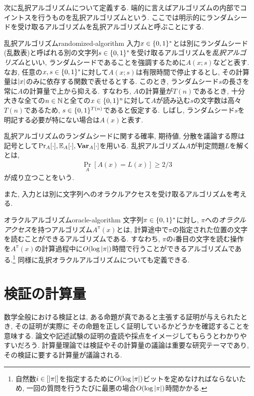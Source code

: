 次に乱択アルゴリズムについて定義する. 端的に言えばアルゴリズムの内部でコイントスを行うものを乱択アルゴリズムという.
ここでは明示的にランダムシードを受け取るアルゴリズムを乱択アルゴリズムと呼ぶことにする.

\begin{definition}{乱択アルゴリズム}{randomized-algorithm}
  入力$x\in\{0,1\}^*$とは別にランダムシード(乱数表)と呼ばれる別の文字列$s\in\{0,1\}^*$を受け取るアルゴリズムを\emph{乱択アルゴリズム}といい, ランダムシードであることを強調するために$A(x;s)$などと表す.
  なお, 任意の$x,s\in\{0,1\}^*$に対して$A(x;s)$は有限時間で停止するとし, その計算量は$\abs{x}$のみに依存する関数で表せるとする.
  このとき, ランダムシード$s$の長さを常に$A$の計算量で上から抑える.
  すなわち, $A$の計算量が$T(n)$であるとき, 十分大きな全ての$n\in\mathbb{N}$と全ての$x\in\{0,1\}^n$に対して$A$が読み込む$s$の文字数は高々$T(n)$であるため, $s\in \{0,1\}^{T(n)}$であると仮定する.
  しばし, ランダムシード$s$を明記する必要が特にない場合は$A(x)$と表す.

  乱択アルゴリズムのランダムシードに関する確率, 期待値, 分散を議論する際は記号として$\Pr_{A}[\cdot],\operatorname*{\mathbb{E}}_A[\cdot],\operatorname*{\mathbf{Var}}_A[\cdot]$を用いる.
  乱択アルゴリズム$A$が判定問題$L$を解くとは,
  \begin{align*}
    \Pr_A[A(x)=L(x)]\geq 2/3
  \end{align*}
  が成り立つことをいう.
\end{definition}

また, 入力とは別に文字列へのオラクルアクセスを受け取るアルゴリズムを考える.
\begin{definition}{オラクルアルゴリズム}{oracle-algorithm}
  文字列$\pi\in\{0,1\}^*$に対し, $\pi$への\emph{オラクルアクセス}を持つアルゴリズム$A^\pi(x)$とは, 計算途中で$\pi$の指定された位置の文字を読むことができるアルゴリズムである.
  すなわち, $\pi$の$i$番目の文字を読む操作を$A^\pi(x)$の計算過程中に$O(\log \abs{\pi})$時間で行うことができるアルゴリズムである.\footnote{自然数$i\in[\abs{\pi}]$を指定するために$O(\log \abs{\pi})$ビットを定めなければならないため, 一回の質問を行うたびに最悪の場合$O(\log \abs{\pi})$時間かかる.}
  同様に乱択オラクルアルゴリズムについても定義できる.
\end{definition}


\section{検証の計算量}
数学全般における検証とは, ある命題が真であると主張する証明が与えられたとき, その証明が実際に
その命題を正しく証明しているかどうかを確認することを意味する.
論文や記述試験の証明の査読や採点をイメージしてもらうとわかりやすいだろう.
計算量理論では検証やその計算量の議論は重要な研究テーマであり, その検証に要する計算量が議論される.

